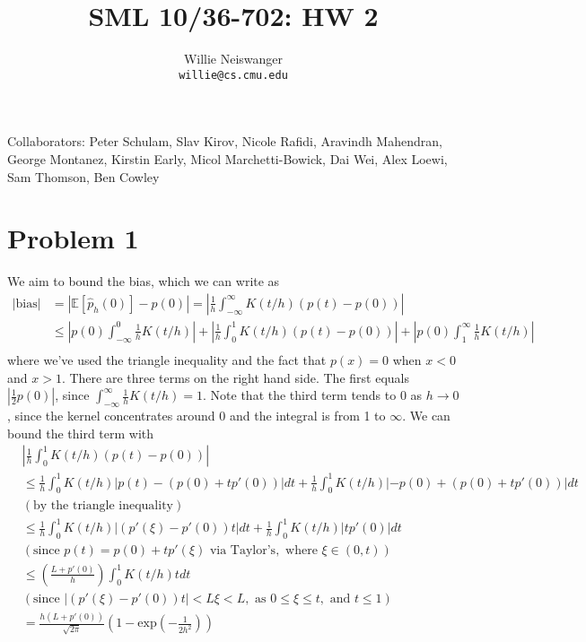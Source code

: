 \documentclass[12pt]{article}
\title{SML 10/36-702: HW 2}
\author{Willie Neiswanger\\
\texttt{willie@cs.cmu.edu}}
\date{}
\begin{document}
\maketitle

\begin{small}
\noindent Collaborators: Peter Schulam, Slav Kirov, Nicole Rafidi, Aravindh Mahendran, George Montanez, Kirstin Early, Micol Marchetti-Bowick, Dai
Wei, Alex Loewi, Sam Thomson, Ben Cowley
\end{small}


\section*{Problem 1}
\label{sec:prob1}
We aim to bound the bias, which we can write as
\begin{equation}
    \begin{split}
        | \text{bias} |
        &= | \mathbb{E}\left[\hat{p}_h(0)\right] - p(0) | 
            = \left| \frac{1}{h} \int_{-\infty}^{\infty} K(t/h)(p(t)-p(0)) \right| \\
        &\leq  \left| p(0) \int_{-\infty}^0 \frac{1}{h} K(t/h) \right|
            + \left| \frac{1}{h} \int_0^1 K(t/h)(p(t)-p(0)) \right|
            + \left| p(0) \int_1^{\infty} \frac{1}{h} K(t/h) \right| \\
    \end{split}
\end{equation}
where we've used the triangle inequality and the fact that $p(x)=0$ when $x<0$ and $x>1$. There are
three terms on the right hand side. The first equals $|\frac{1}{2}p(0)|$, since 
$\int_{-\infty}^{\infty} \frac{1}{h} K(t/h) = 1$. Note that the third term tends to 0 as
$h \rightarrow 0$, since the kernel concentrates around 0 and the integral is from 1 to $\infty$.
We can bound the third term with
\begin{equation*}
    \begin{split}
        &\left| \frac{1}{h} \int_0^1 K(t/h)(p(t)-p(0)) \right| \\
        &\leq \frac{1}{h}\int_0^1 K(t/h) |p(t) - (p(0) + tp'(0))|dt
            + \frac{1}{h}\int_0^1 K(t/h) |-p(0) + (p(0) + tp'(0))|dt \\
        &(\text{by the triangle inequality})\\
        &\leq \frac{1}{h}\int_0^1 K(t/h) |(p'(\xi) - p'(0)) t| dt
            + \frac{1}{h}\int_0^1 K(t/h) |t p'(0)| dt \\
            &(\text{since } p(t) = p(0) + tp'(\xi) \text{ via Taylor's}, \text{ where }\xi \in (0,t))\\
        &\leq \left( \frac{L+p'(0)}{h} \right) \int_0^1 K(t/h) t dt \\
        &(\text{since } |(p'(\xi) - p'(0)) t| < L\xi < L, \text{ as } 0 \leq \xi \leq t, \text{ and } t \leq 1) \\
        &= \frac{h(L+p'(0))}{\sqrt{2\pi}} \left(1 - \text{exp}\left(-\frac{1}{2h^2}\right) \right)
    \end{split}
\end{equation*}
\end{document}
